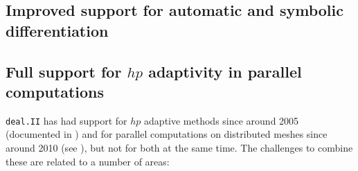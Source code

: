 \documentclass{ansarticle-preprint}
\newcommand{\specialword}[1]{\texttt{#1}}
\newcommand{\dealii}{{\specialword{deal.II}}\xspace}
\begin{document}
\subsection{Improved support for automatic and symbolic differentiation}
\label{subsec:ad}

\subsection{Full support for $hp$ adaptivity in parallel computations}
\label{subsec:hp}

\dealii{} has had support for $hp$ adaptive methods since around 2005
(documented in \cite{BangerthKayserHerold2007}) and for parallel
computations on distributed meshes since around 2010 (see
\cite{BangerthBursteddeHeisterKronbichler11}), but not for both at the
same time. The challenges to combine these are related to a number of
areas:
\end{document}
